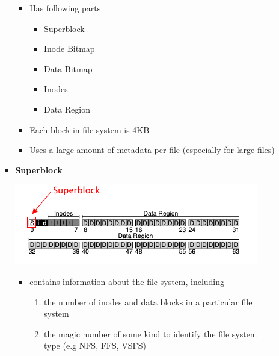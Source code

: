 \documentclass[12pt]{article}
\begin{document}
\begin{enumerate}[1.]
\begin{enumerate}[a)]
\begin{itemize}
            \begin{itemize}
                \item Has following parts

                \begin{itemize}
                    \item Superblock
                    \item Inode Bitmap
                    \item Data Bitmap
                    \item Inodes
                    \item Data Region
                \end{itemize}

                \item Each block in file system is 4KB
                \item Uses a large amount of metadata per file (especially for large files)
            \end{itemize}

            \item \textbf{Superblock}

            \begin{center}
            \includegraphics[width=\linewidth]{images/midterm_1_solution_9.png}
            \end{center}

            \begin{itemize}
                \item contains information about the file system, including

                \begin{enumerate}[1.]
                    \item the number of inodes and data blocks in a particular file system
                    \item the magic number of some kind to identify the file system type (e.g NFS, FFS, VSFS)
                \end{enumerate}


\end{itemize}
\end{itemize}
\end{enumerate}
\end{enumerate}
\end{document}
